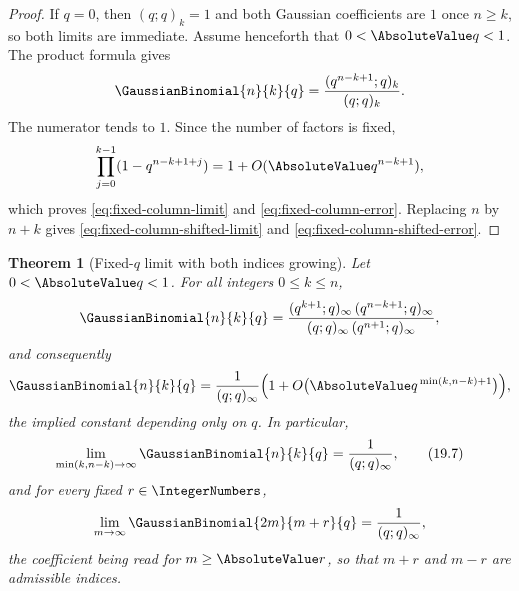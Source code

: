 \documentclass[11pt,a4paper,oneside,openany]{book}
\newtheorem{theorem}{Theorem}[chapter]
\theoremstyle{definition}
\theoremstyle{remark}
\begin{document}
\begin{proof}
If $q=0$, then $(q;q)_k=1$ and both Gaussian coefficients are $1$ once
$n\ge k$, so both limits are immediate.  Assume henceforth that
$0<\AbsoluteValue q<1$.  The product formula gives
\[
 \GaussianBinomial{n}{k}{q}=\frac{(q^{n-k+1};q)_k}{(q;q)_k}.
\]
The numerator tends to $1$.  Since the number of factors is fixed,
\[
 \prod_{j=0}^{k-1}(1-q^{n-k+1+j})
 =1+O(\AbsoluteValue q^{n-k+1}),
\]
which proves \eqref{eq:fixed-column-limit} and
\eqref{eq:fixed-column-error}.  Replacing $n$ by $n+k$ gives
\eqref{eq:fixed-column-shifted-limit} and
\eqref{eq:fixed-column-shifted-error}.
\end{proof}

\begin{theorem}[Fixed-$q$ limit with both indices growing]\label{thm:central-fixed-q}
Let $0<\AbsoluteValue q<1$.  For all integers $0\le k\le n$,
\[
 \GaussianBinomial{n}{k}{q}
 =\frac{(q^{k+1};q)_\infty\,(q^{n-k+1};q)_\infty}
       {(q;q)_\infty\,(q^{n+1};q)_\infty},
\]
and consequently
\[
 \GaussianBinomial{n}{k}{q}
 =\frac1{(q;q)_\infty}
 \Bigl(1+O\bigl(\AbsoluteValue q^{\,\min(k,n-k)+1}\bigr)\Bigr),
\]
the implied constant depending only on $q$.  In particular,
\[
 \lim_{\min(k,n-k)\to\infty}\GaussianBinomial{n}{k}{q}=\frac1{(q;q)_\infty},
 \tag{19.7}\label{eq:central-fixed-q}
\]
and for every fixed $r\in\IntegerNumbers$,
\[
 \lim_{m\to\infty}\GaussianBinomial{2m}{m+r}{q}=\frac1{(q;q)_\infty},
\]
the coefficient being read for $m\ge\AbsoluteValue r$, so that $m+r$ and $m-r$ are
admissible indices.
\end{theorem}
\end{document}
